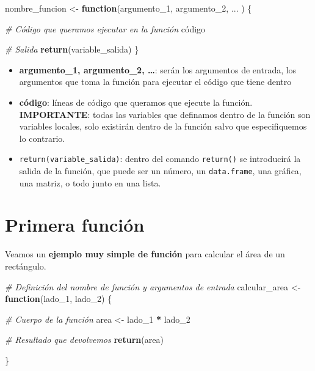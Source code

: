 \documentclass[11pt,]{book}
\newenvironment{Shaded}{\begin{snugshade}}{\end{snugshade}}
\newcommand{\CommentTok}[1]{\textcolor[rgb]{0.37,0.37,0.37}{\textit{#1}}}
\newcommand{\ControlFlowTok}[1]{\textcolor[rgb]{0.27,0.27,0.27}{\textbf{#1}}}
\newcommand{\DecValTok}[1]{\textcolor[rgb]{0.06,0.06,0.06}{#1}}
\newcommand{\KeywordTok}[1]{\textcolor[rgb]{0.27,0.27,0.27}{\textbf{#1}}}
\newcommand{\NormalTok}[1]{#1}
\newcommand{\OperatorTok}[1]{\textcolor[rgb]{0.43,0.43,0.43}{\textbf{#1}}}
\newcommand{\StringTok}[1]{\textcolor[rgb]{0.5,0.5,0.5}{#1}}
\providecommand{\tightlist}{%
  \setlength{\itemsep}{0pt}\setlength{\parskip}{0pt}}
\begin{document}
\begin{Shaded}
\begin{Highlighting}[]
\NormalTok{nombre_funcion <-}\StringTok{ }\ControlFlowTok{function}\NormalTok{(argumento_}\DecValTok{1}\NormalTok{, argumento_}\DecValTok{2}\NormalTok{, ... ) \{}
  
  \CommentTok{# Código que queramos ejecutar en la función}
\NormalTok{  código}
  
  \CommentTok{# Salida}
  \KeywordTok{return}\NormalTok{(variable_salida)}
\NormalTok{\}}
\end{Highlighting}
\end{Shaded}

\begin{itemize}
\tightlist
\item
  \textbf{argumento\_1, argumento\_2, \ldots{}}: serán los argumentos de entrada, los argumentos que toma la función para ejecutar el código que tiene dentro
\item
  \textbf{código}: líneas de código que queramos que ejecute la función. \textbf{IMPORTANTE}: todas las variables que definamos dentro de la función son variables locales, solo existirán dentro de la función salvo que especifiquemos lo contrario.
\item
  \texttt{return(variable\_salida)}: dentro del comando \texttt{return()} se introducirá la salida de la función, que puede ser un número, un \texttt{data.frame}, una gráfica, una matriz, o todo junto en una lista.
\end{itemize}

\hypertarget{primera-funciuxf3n}{%
\section{Primera función}\label{primera-funciuxf3n}}

Veamos un \textbf{ejemplo muy simple de función} para calcular el área de un rectángulo.

\begin{Shaded}
\begin{Highlighting}[]
\CommentTok{# Definición del nombre de función y argumentos de entrada}
\NormalTok{calcular_area <-}\StringTok{ }\ControlFlowTok{function}\NormalTok{(lado_}\DecValTok{1}\NormalTok{, lado_}\DecValTok{2}\NormalTok{) \{}
  
  \CommentTok{# Cuerpo de la función}
\NormalTok{  area <-}\StringTok{ }\NormalTok{lado_}\DecValTok{1} \OperatorTok{*}\StringTok{ }\NormalTok{lado_}\DecValTok{2}
  
  \CommentTok{# Resultado que devolvemos}
  \KeywordTok{return}\NormalTok{(area)}
  
\NormalTok{\}}
\end{Highlighting}
\end{Shaded}
\end{document}
